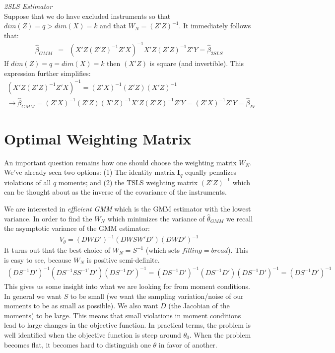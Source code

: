 \documentclass[a4paper]{article}
\begin{document}
\noindent \textit{2SLS Estimator}\\
Suppose that we do have excluded instruments so that $dim(Z) = q > dim(X) = k$ and that $W_N = (Z'Z)^{-1}$. It immediately follows that:
\begin{eqnarray*}
\hat{\beta}_{GMM} &=& (X'Z (Z'Z)^{-1} Z' X)^{-1} X' Z (Z'Z)^{-1} Z'Y = \hat{\beta}_{2SLS}
\end{eqnarray*}
If $dim(Z) = q = dim(X) = k$ then $(X'Z)$ is square (and invertible). This expression further simplifies:
\begin{eqnarray*}
(X'Z (Z'Z)^{-1} Z' X)^{-1} = (Z'X)^{-1} (Z'Z) (X'Z)^{-1}\\
\rightarrow \hat{\beta}_{GMM} = (Z'X)^{-1} (Z'Z) (X'Z)^{-1}  X' Z (Z'Z)^{-1} Z'Y = (Z'X)^{-1} Z'Y = \hat{\beta}_{IV}
\end{eqnarray*}


\section*{\normalsize  Optimal Weighting Matrix}
An important question remains how one should choose the weighting matrix $W_N$. We've already seen two options: (1) The identity matrix $\mathbf{I}_q$ equally penalizes violations of all $q$ moments; and (2) the TSLS weighting matrix $(Z'Z)^{-1}$ which can be thought about as the inverse of the covariance of the instruments. 


We are interested in \textit{efficient GMM} which is the GMM estimator with the lowest variance. In order to find the $W_N$ which minimizes the variance of $\hat{\theta}_{GMM}$ we recall the asymptotic variance of the GMM estimator:
\begin{eqnarray*}
V_{\theta} =(D W D')^{-1} (D W S W' D') (D W D')^{-1}
\end{eqnarray*}
It turns out that the best choice of $W_N = S^{-1}$ (which sets $filling = bread$). This is easy to see, because $W_N$ is positive semi-definite.
\begin{eqnarray*}
(D S^{-1} D')^{-1} (D S^{-1} S S^{-1'} D') (D S^{-1} D')^{-1} = (D S^{-1} D')^{-1} (D S^{-1} D') (D S^{-1} D')^{-1} = (D S^{-1} D')^{-1}
\end{eqnarray*}
This gives us some insight into what we are looking for from moment conditions. In general we want $S$ to be small (we want the sampling variation/noise of our moments to be as small as possible). We also want $D$ (the Jacobian of the moments) to be large. This means that small violations in moment conditions lead to large changes in the objective function. In practical terms, the problem is well identified when the objective function is steep around $\theta_0$. When the problem becomes flat, it becomes hard to distinguish one $\theta$ in favor of another.
\end{document}
